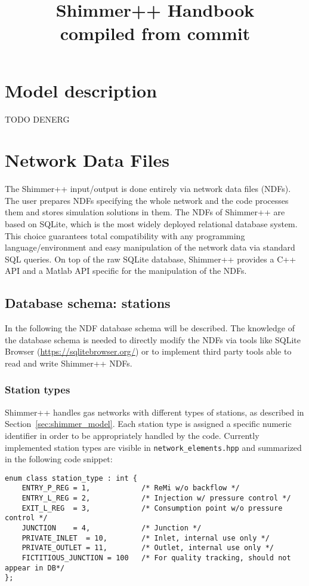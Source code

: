 \documentclass[10pt]{article}
\title{Shimmer++ Handbook\\{\footnotesize compiled from commit \gitrevision}}
\begin{document}
\maketitle
\tableofcontents

\section{Model description}
TODO DENERG

\section{Network Data Files}
The Shimmer++ input/output is done entirely via network data files (NDFs). The
user prepares NDFs specifying the whole network and the code processes them and
stores simulation solutions in them.
The NDFs of Shimmer++ are based on SQLite, which is the
most widely deployed relational database system. This choice guarantees total
compatibility with any programming language/environment and easy manipulation of
the network data via standard SQL queries. On top of the raw SQLite database, Shimmer++ provides a C++
API and a Matlab API specific for the manipulation of the NDFs.

\subsection{Database schema: stations}
In the following the NDF database schema will be described. The knowledge of
the database schema is needed to directly modify the NDFs via tools like
SQLite Browser (\url{https://sqlitebrowser.org/}) or to implement third party
tools able to read and write Shimmer++ NDFs.

\subsubsection{Station types}
Shimmer++ handles gas networks with different types of stations, as described
in Section~\ref{sec:shimmer_model}. Each station type is assigned a specific
numeric identifier in order to be appropriately handled by the code. Currently
implemented station types are visible in \texttt{network\_elements.hpp} and
summarized in the following code snippet: 

\begin{verbatim}
enum class station_type : int {
    ENTRY_P_REG = 1,            /* ReMi w/o backflow */
    ENTRY_L_REG = 2,            /* Injection w/ pressure control */
    EXIT_L_REG  = 3,            /* Consumption point w/o pressure control */
    JUNCTION    = 4,            /* Junction */
    PRIVATE_INLET  = 10,        /* Inlet, internal use only */
    PRIVATE_OUTLET = 11,        /* Outlet, internal use only */
    FICTITIOUS_JUNCTION = 100   /* For quality tracking, should not appear in DB*/
};
\end{verbatim}
\end{document}
